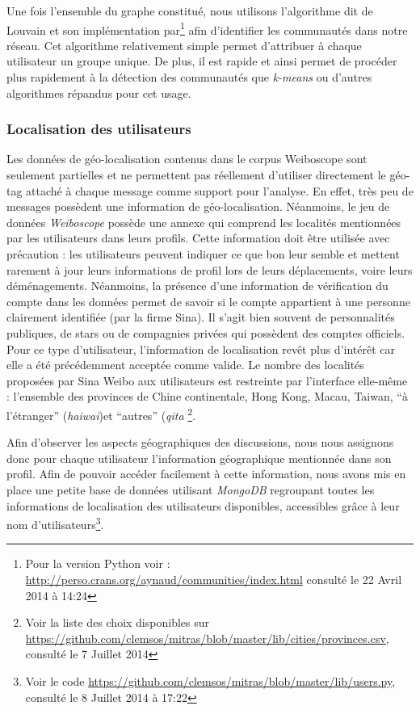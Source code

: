     Une fois l{\textquoteright}ensemble du graphe constitué, nous utilisons l{\textquoteright}algorithme dit de Louvain et son implémentation par\citep{Blondel2008}\footnote{Pour la version Python voir : \url{http://perso.crans.org/aynaud/communities/index.html} consulté le 22 Avril 2014 à 14:24} afin d'identifier les  communautés dans notre réseau. Cet algorithme relativement simple permet d'attribuer à chaque utilisateur un groupe unique. De plus, il est rapide et ainsi permet de procéder plus rapidement à la détection des communautés que \textit{k-means} ou d'autres algorithmes répandus pour cet usage.

\subsubsection[Localisation des utilisateurs]{Localisation des utilisateurs}

    Les données de géo-localisation contenus dans le corpus Weiboscope sont seulement partielles et ne permettent pas réellement d'utiliser directement le géo-tag attaché à chaque message comme support pour l'analyse. En effet, très peu de messages possèdent une information de géo-localisation. Néanmoins, le jeu de données \textit{Weiboscope} possède une annexe qui comprend les localités mentionnées par les utilisateurs dans leurs profils. Cette information doit être utilisée avec précaution : les utilisateurs peuvent indiquer ce que bon leur semble et mettent rarement à jour leurs informations de profil lors de leurs déplacements, voire leurs déménagements. Néanmoins, la présence d'une information de vérification du compte dans les données permet de savoir si le compte appartient à une personne clairement identifiée (par la firme Sina). Il s'agit bien souvent de personnalités publiques, de stars ou de compagnies privées qui possèdent des comptes officiels. Pour ce type d'utilisateur, l'information de localisation revêt plus d'intérêt car elle a été  précédemment acceptée comme valide. Le nombre des localités proposées par Sina Weibo aux utilisateurs est restreinte par l{\textquoteright}interface  elle-même : l{\textquoteright}ensemble des provinces de Chine continentale, Hong Kong, Macau, Taiwan, {\textquotedblleft}à l{\textquoteright}étranger{\textquotedblright} (\textit{haiwai})et {\textquotedblleft}autres{\textquotedblright} (\textit{qita} \footnote{Voir la liste des choix disponibles sur \url{https://github.com/clemsos/mitras/blob/master/lib/cities/provinces.csv}, consulté le 7 Juillet 2014}.

    Afin d'observer les aspects géographiques des discussions, nous nous assignons donc pour chaque utilisateur l{\textquoteright}information géographique mentionnée dans son profil. Afin de pouvoir accéder facilement à cette information, nous avons mis en place une petite base de données utilisant \textit{MongoDB} regroupant toutes les informations de localisation des utilisateurs disponibles, accessibles grâce à leur nom d'utilisateurs\footnote{Voir le code \url{https://github.com/clemsos/mitras/blob/master/lib/users.py}, consulté le 8 Juillet 2014 à 17:22}.


